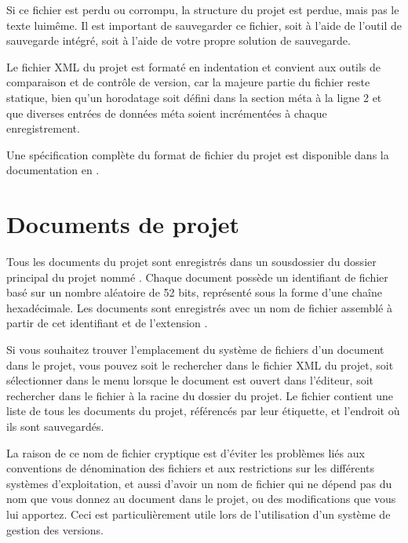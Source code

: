 \documentclass[a4paper,11pt,french]{sphinxmanual}
\begin{document}
\sphinxAtStartPar
Si ce fichier est perdu ou corrompu, la structure du projet est perdue, mais pas le texte lui\sphinxhyphen{}même. Il est important de sauvegarder ce fichier, soit à l’aide de l’outil de sauvegarde intégré, soit à l’aide de votre propre solution de sauvegarde.

\sphinxAtStartPar
Le fichier XML du projet est formaté en indentation et convient aux outils de comparaison et de contrôle de version, car la majeure partie du fichier reste statique, bien qu’un horodatage soit défini dans la section méta à la ligne 2 et que diverses entrées de données méta soient incrémentées à chaque enregistrement.

\sphinxAtStartPar
Une spécification complète du format de fichier du projet est disponible dans la documentation en .


\section{Documents de projet}
\label{\detokenize{tech_storage:project-documents}}
\sphinxAtStartPar
Tous les documents du projet sont enregistrés dans un sous\sphinxhyphen{}dossier du dossier principal du projet nommé . Chaque document possède un identifiant de fichier basé sur un nombre aléatoire de 52 bits, représenté sous la forme d’une chaîne hexadécimale. Les documents sont enregistrés avec un nom de fichier assemblé à partir de cet identifiant et de l’extension .

\sphinxAtStartPar
Si vous souhaitez trouver l’emplacement du système de fichiers d’un document dans le projet, vous pouvez soit le rechercher dans le fichier XML du projet, soit sélectionner  dans le menu  lorsque le document est ouvert dans l’éditeur, soit rechercher dans le fichier  à la racine du dossier du projet. Le fichier  contient une liste de tous les documents du projet, référencés par leur étiquette, et l’endroit où ils sont sauvegardés.

\sphinxAtStartPar
La raison de ce nom de fichier cryptique est d’éviter les problèmes liés aux conventions de dénomination des fichiers et aux restrictions sur les différents systèmes d’exploitation, et aussi d’avoir un nom de fichier qui ne dépend pas du nom que vous donnez au document dans le projet, ou des modifications que vous lui apportez. Ceci est particulièrement utile lors de l’utilisation d’un système de gestion des versions.
\end{document}
